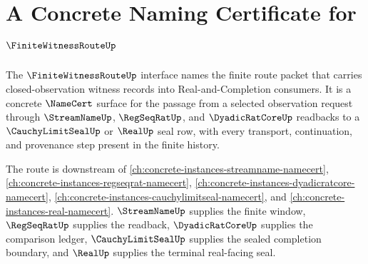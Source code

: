 \chapter{A Concrete Naming Certificate for $\FiniteWitnessRouteUp$}
\label{ch:concrete-instances-finitewitnessroute-namecert}

The $\FiniteWitnessRouteUp$ interface names the finite route packet that carries closed-observation witness records into Real-and-Completion consumers. It is a concrete $\NameCert$ surface for the passage from a selected observation request through $\StreamNameUp$, $\RegSeqRatUp$, and $\DyadicRatCoreUp$ readbacks to a $\CauchyLimitSealUp$ or $\RealUp$ seal row, with every transport, continuation, and provenance step present in the finite history.

The route is downstream of \autoref{ch:concrete-instances-streamname-namecert}, \autoref{ch:concrete-instances-regseqrat-namecert}, \autoref{ch:concrete-instances-dyadicratcore-namecert}, \autoref{ch:concrete-instances-cauchylimitseal-namecert}, and \autoref{ch:concrete-instances-real-namecert}. $\StreamNameUp$ supplies the finite window, $\RegSeqRatUp$ supplies the readback, $\DyadicRatCoreUp$ supplies the comparison ledger, $\CauchyLimitSealUp$ supplies the sealed completion boundary, and $\RealUp$ supplies the terminal real-facing seal.


